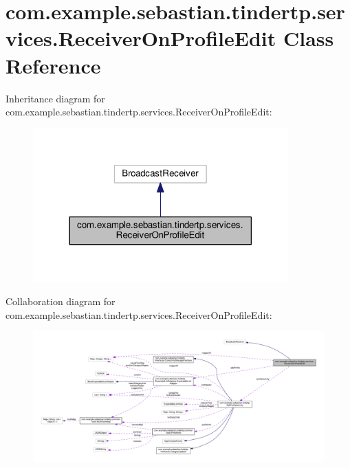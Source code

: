 \hypertarget{classcom_1_1example_1_1sebastian_1_1tindertp_1_1services_1_1ReceiverOnProfileEdit}{}\section{com.\+example.\+sebastian.\+tindertp.\+services.\+Receiver\+On\+Profile\+Edit Class Reference}
\label{classcom_1_1example_1_1sebastian_1_1tindertp_1_1services_1_1ReceiverOnProfileEdit}


Inheritance diagram for com.\+example.\+sebastian.\+tindertp.\+services.\+Receiver\+On\+Profile\+Edit\+:\nopagebreak
\begin{figure}[H]
\begin{center}
\leavevmode
\includegraphics[width=278pt]{classcom_1_1example_1_1sebastian_1_1tindertp_1_1services_1_1ReceiverOnProfileEdit__inherit__graph}
\end{center}
\end{figure}


Collaboration diagram for com.\+example.\+sebastian.\+tindertp.\+services.\+Receiver\+On\+Profile\+Edit\+:
\nopagebreak
\begin{figure}[H]
\begin{center}
\leavevmode
\includegraphics[width=350pt]{classcom_1_1example_1_1sebastian_1_1tindertp_1_1services_1_1ReceiverOnProfileEdit__coll__graph}
\end{center}
\end{figure}
